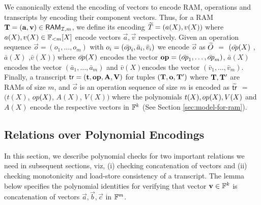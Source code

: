 We canonically extend the encoding of vectors to encode RAM, operations and transcripts by encoding their component vectors.
Thus, for a RAM $\mathbf{T}=(\mathbf{a},\mathbf{v})\in \mathsf{RAM}_{\mathcal{I}, {m}}$, we define its encoding
$\widetilde{T}=(a(X),v(X))$ where $a(X),v(X)\in \mathbb{F}_{<m}[X]$ encode vectors $\vec{a}, \vec{v}$ respectively.
Given an operation sequence
$\vec{o}=(o_1,\ldots,o_m)$ with $o_i=(\bar{{op}}_i,\bar{a}_i,\bar{v}_i)$ we encode $\vec{o}$ as
$\widetilde{O}$ $=$ $(\bar{{op}}(X)$ ,$\bar{a}(X)$ ,$\bar{v}(X))$
where $\bar{{op}}(X)$ encodes the
vector $\mathbf{{op}}=(\bar{{op}}_1,\ldots,\bar{{op}}_m)$, $\bar{a}(X)$ encodes the vector $(\bar{a}_1,\ldots,\bar{a}_m)$ and
$\bar{v}(X)$encodes the vector $(\bar{v}_1,\ldots,\bar{v}_m)$.
Finally, a transcript $\mathsf{tr}=(\mathbf{t},\mathbf{{op}},\mathbf{A},\mathbf{V})$ for tuples $(\mathbf{T},\mathbf{o},\mathbf{T}')$ where $\mathbf{T},\mathbf{T}'$ are RAMs of size $m$,
and $\vec{o}$ is an operation sequence of size $m$ is encoded as $\widetilde{\mathsf{tr}}$ $=$ $(t(X)$, ${op}(X)$, $A(X)$, $V(X))$
where the polynomials $t(X),{op}(X),V(X)$ and $A(X)$ encode the respective vectors in $\mathbb{F}^k$ (See Section \ref{sec:model-for-ram}).

\subsection{Relations over Polynomial Encodings}\label{subsec:encoded-relations}
In this section, we describe polynomial checks for two important relations we need in subsequent sections, viz,
(i) checking concatenation of vectors and (ii) checking monotonicity and load-store consistency of a transcript.
The lemma below specifies the polynomial identities for verifying
that vector $\mathbf{v}\in \mathbb{F}^k$ is concatenation of vectors $\vec{a},\vec{b},\vec{c}$ in $\mathbb{F}^m$.

